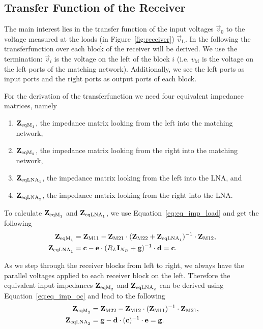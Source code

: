 \subsection{Transfer Function of the Receiver}
\label{sec:transf}
The main interest lies in the transfer function of the input voltages $\vec{v}_0$ to the voltage measured at the loads (in Figure~\ref{fig:receiver}) $\vec{v}_\text{L}$.
In the following the transferfunction over each block of the receiver will be derived.
We use the termination: $\vec{v}_i$ is the voltage on the left of the block $i$ (i.e. $v_\text{M}$ is the voltage on the left ports of the matching network).
Additionally, we see the left ports as input ports and the right ports as output ports of each block.

For the derivation of the transferfunction we need four equivalent impedance matrices, namely
\begin{enumerate}
\item{$\mathbf{Z}_{\text{eqM}_1}$, the impedance matrix looking from the left into the matching network,}
\item{$\mathbf{Z}_{\text{eqM}_2}$, the impedance matrix looking from the right into the matching network,}
\item{$\mathbf{Z}_{\text{eqLNA}_1}$, the impedance matrix looking from the left into the LNA, and}
\item{$\mathbf{Z}_{\text{eqLNA}_2}$, the impedance matrix looking from the right into the LNA.}
\end{enumerate}

To calculate $\mathbf{Z}_{\text{eqM}_1}$ and $\mathbf{Z}_{\text{eqLNA}_1}$, we use Equation~\eqref{eq:eq_imp_load} and get the following
\begin{align}
\label{eq:zeqm1}
\mathbf{Z}_{\text{eqM}_1} &= \mathbf{Z}_\text{M11} - \mathbf{Z}_\text{M21}\cdot(\mathbf{Z}_\text{M22} + \mathbf{Z}_{\text{eqLNA}_1})^{-1}\cdot\mathbf{Z}_\text{M12},\\
\label{eq:zeqlna1}
\mathbf{Z}_{\text{eqLNA}_1} &= \mathbf{c} - \mathbf{e}\cdot(R_L\mathbf{I}_{N_R} + \mathbf{g})^{-1}\cdot\mathbf{d} = \mathbf{c}.
\end{align}

As we step through the receiver blocks from left to right, we always have the parallel voltages applied to each receiver block on the left.
Therefore the equivalent input impedances $\mathbf{Z}_{\text{eqM}_2}$ and $\mathbf{Z}_{\text{eqLNA}_2}$ can be derived using Equation~\eqref{eq:eq_imp_oc} and lead to the following
\begin{align}
\label{eq:zeqm2}
\mathbf{Z}_{\text{eqM}_2} &= \mathbf{Z}_\text{M22} - \mathbf{Z}_\text{M12}\cdot(\mathbf{Z}_\text{M11})^{-1}\cdot\mathbf{Z}_\text{M21},\\
\label{eq:zeqlna2}
\mathbf{Z}_{\text{eqLNA}_2} &= \mathbf{g} - \mathbf{d}\cdot(\mathbf{c})^{-1}\cdot\mathbf{e} = \mathbf{g}.
\end{align}

